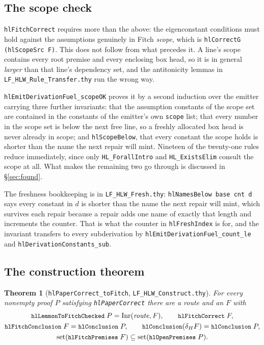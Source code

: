 \documentclass[11pt]{article}
\theoremstyle{plain}
\newtheorem*{theorem*}{Theorem}
\newcommand{\ubrk}{\_\discretionary{}{}{}}
\newcommand{\isa}[1]{\textup{\texttt{\small #1}}}
\newcommand{\thy}[1]{\textup{\texttt{\small #1}}}
\begin{document}
\subsection{The scope check}\label{sec:scopecheck}

\isa{hlFitchCorrect} requires more than the above: the eigenconstant conditions
must hold against the assumptions genuinely in Fitch \emph{scope}, which is
\isa{hlCorrectG (hlScopeSrc F)}. This does not follow from what precedes it. A
line's scope contains every root premise and every enclosing box head, so it is
in general \emph{larger} than that line's dependency set, and the antitonicity
lemmas in \thy{LF\ubrk{}HLW\ubrk{}Rule\ubrk{}Transfer.thy} run the wrong way.

\isa{hlEmitDerivationFuel\ubrk{}scopeOK} proves it by a second induction over the
emitter carrying three further invariants: that the assumption constants of the
scope set are contained in the constants of the emitter's own \isa{scope} list;
that every number in the scope set is below the next free line, so a freshly
allocated box head is never already in scope; and \isa{hlScopeBelow}, that every
constant the scope holds is shorter than the name the next repair will mint.
Nineteen of the twenty-one rules reduce immediately, since only
\isa{HL\ubrk{}ForallIntro} and \isa{HL\ubrk{}ExistsElim} consult the scope at all. What
makes the remaining two go through is discussed in \S\ref{sec:found}.

The freshness bookkeeping is in \thy{LF\ubrk{}HLW\ubrk{}Fresh.thy}:
\isa{hlNamesBelow base cnt d} says every constant in $d$ is shorter than the
name the next repair will mint, which survives each repair because a repair adds
one name of exactly that length and increments the counter. That is what the
counter in \isa{hlFreshIndex} is for, and the invariant transfers to every
subderivation by \isa{hlEmitDerivationFuel\ubrk{}count\ubrk{}le} and
\isa{hlDerivationConstants\ubrk{}sub}.

\subsection{The construction theorem}

\begin{theorem*}[\isa{hlPaperCorrect\ubrk{}toFitch}, \thy{LF\ubrk{}HLW\ubrk{}Construct.thy}]
For every nonempty proof $P$ satisfying \isa{hlPaperCorrect} there are a
route and an $F$ with
\begin{gather*}
  \isa{hlLemmonToFitchChecked}\;P = \mathrm{Inr}(\mathit{route},F),
  \qquad \isa{hlFitchCorrect}\;F, \\
  \isa{hlFitchConclusion}\;F = \isa{hlConclusion}\;P, \qquad
  \isa{hlConclusion}(\delta_H F) = \isa{hlConclusion}\;P, \\
  \mathrm{set}(\isa{hlFitchPremises}\;F) \subseteq
    \mathrm{set}(\isa{hlOpenPremises}\;P).
\end{gather*}
\end{theorem*}
\end{document}
